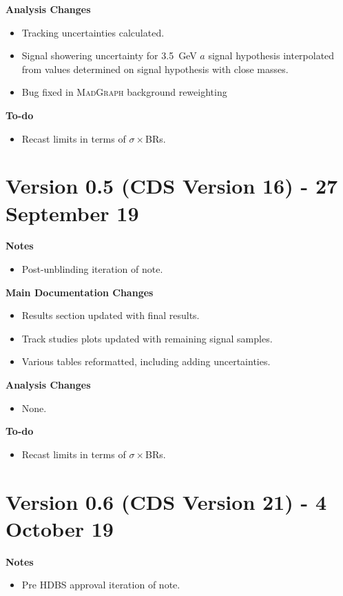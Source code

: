 \documentclass[NOTE, atlasdraft=true, texlive=2017, UKenglish]{\ATLASLATEXPATH atlasdoc}
\begin{document}
\textbf{Analysis Changes}
\begin{itemize}
\item Tracking uncertainties calculated.
\item Signal showering uncertainty for 3.5~GeV $a$ signal hypothesis interpolated from values determined on signal hypothesis with close masses.
\item Bug fixed in \textsc{MadGraph} background reweighting
\end{itemize}

\textbf{To-do}
\begin{itemize}
\item Recast limits in terms of $\sigma\times$BRs.
\end{itemize}


\section*{Version 0.5 (CDS Version 16) - 27 September 19}

\textbf{Notes}
\begin{itemize}
\item Post-unblinding iteration of note.
\end{itemize}

\textbf{Main Documentation Changes}
\begin{itemize}
\item Results section updated with final results.
\item Track studies plots updated with remaining signal samples.
\item Various tables reformatted, including adding uncertainties.
\end{itemize}

\textbf{Analysis Changes}
\begin{itemize}
\item None.
\end{itemize}

\textbf{To-do}
\begin{itemize}
\item Recast limits in terms of $\sigma\times$BRs.
\end{itemize}


\section*{Version 0.6 (CDS Version 21) - 4 October 19}

\textbf{Notes}
\begin{itemize}
\item Pre HDBS approval iteration of note.
\end{itemize}
\end{document}
